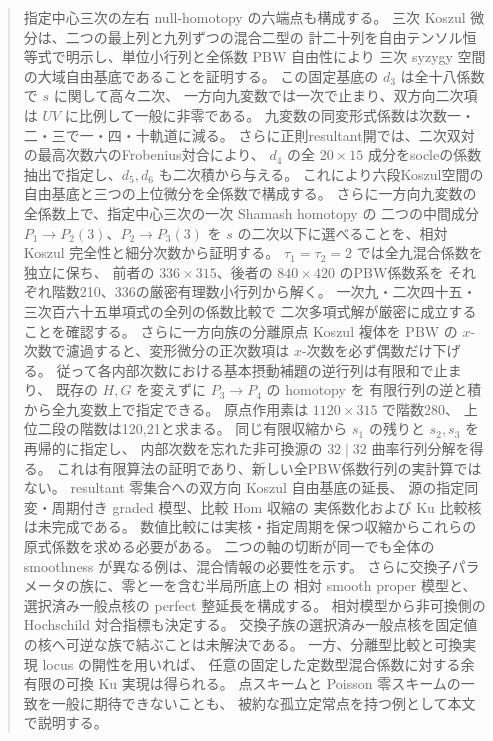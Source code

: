 \begin{abstract}
指定中心三次の左右 null-homotopy の六端点も構成する。
三次 Koszul 微分は、二つの最上列と九列ずつの混合二型の
計二十列を自由テンソル恒等式で明示し、単位小行列と全係数 PBW 自由性により
三次 syzygy 空間の大域自由基底であることを証明する。
この固定基底の $d_3$ は全十八係数で $s$ に関して高々二次、
一方向九変数では一次で止まり、双方向二次項は $UV$ に比例して一般に非零である。
九変数の同変形式係数は次数一・二・三で一・四・十軌道に減る。
さらに正則resultant開では、二次双対の最高次数六のFrobenius対合により、
$d_4$ の全 $20\times15$ 成分をsocleの係数抽出で指定し、$d_5,d_6$ も二次積から与える。
これにより六段Koszul空間の自由基底と三つの上位微分を全係数で構成する。
さらに一方向九変数の全係数上で、指定中心三次の一次 Shamash homotopy の
二つの中間成分 $P_1\to P_2(3)$、$P_2\to P_3(3)$ を
$s$ の二次以下に選べることを、相対 Koszul 完全性と細分次数から証明する。
$\tau_1=\tau_2=2$ では全九混合係数を独立に保ち、
前者の $336\times315$、後者の $840\times420$ のPBW係数系を
それぞれ階数210、336の厳密有理数小行列から解く。
一次九・二次四十五・三次百六十五単項式の全列の係数比較で
二次多項式解が厳密に成立することを確認する。
さらに一方向族の分離原点 Koszul 複体を
PBW の $x$-次数で濾過すると、変形微分の正次数項は
$x$-次数を必ず偶数だけ下げる。
従って各内部次数における基本摂動補題の逆行列は有限和で止まり、
既存の $H,G$ を変えずに $P_3\to P_4$ の homotopy を
有限行列の逆と積から全九変数上で指定できる。
原点作用素は $1120\times315$ で階数280、
上位二段の階数は120,21と求まる。
同じ有限収縮から $s_1$ の残りと $s_2,s_3$ を再帰的に指定し、
内部次数を忘れた非可換源の $32\mid32$ 曲率行列分解を得る。
これは有限算法の証明であり、新しい全PBW係数行列の実計算ではない。
resultant 零集合への双方向 Koszul 自由基底の延長、
源の指定同変・周期付き graded 模型、比較 Hom 収縮の
実係数化および Ku 比較核は未完成である。
数値比較には実核・指定周期を保つ収縮からこれらの原式係数を求める必要がある。
二つの軸の切断が同一でも全体の smoothness が異なる例は、混合情報の必要性を示す。
さらに交換子パラメータの族に、零と一を含む半局所底上の
相対 smooth proper 模型と、選択済み一般点核の perfect 整延長を構成する。
相対模型から非可換側の Hochschild 対合指標も決定する。
交換子族の選択済み一般点核を固定値の核へ可逆な族で結ぶことは未解決である。
一方、分離型比較と可換実現 locus の開性を用いれば、
任意の固定した定数型混合係数に対する余有限の可換 Ku 実現は得られる。
点スキームと Poisson 零スキームの一致を一般に期待できないことも、
被約な孤立定常点を持つ例として本文で説明する。
\end{abstract}

\setcounter{tocdepth}{1}
\tableofcontents

